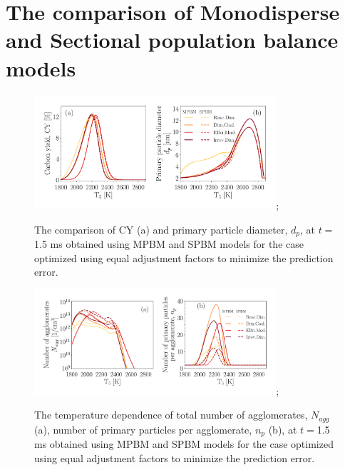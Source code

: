 \section{The comparison of Monodisperse and Sectional population balance models}

\begin{figure}[H]
	\centering
	\includegraphics[width=0.8\textwidth]{Figures/Results/Shocktube/Agafonov2016_cpr/carbon_yield_d_p_pdynamics.pdf};
	\caption{The comparison of CY (a) and primary particle diameter, $d_p$, at $t=$1.5 ms obtained using MPBM and SPBM models for the case optimized using equal adjustment factors to minimize the prediction error.}
	\label{fig:shockagof_yield_dp_cpr_pdynamics} 
\end{figure}


\begin{figure}[H]
	\centering
	\includegraphics[width=0.8\textwidth]{Figures/Results/Shocktube/Agafonov2016_cpr/N_agg_n_p_pdynamics.pdf};
	\caption{The temperature dependence of total number of agglomerates, $N_{agg}$ (a), number of primary particles per agglomerate, $n_p$ (b), at $t=$1.5 ms obtained using MPBM and SPBM models for the case optimized using equal adjustment factors to minimize the prediction error.}
	\label{fig:shockagof_N_agg_n_p_cpr_pdynamics} 
\end{figure}

